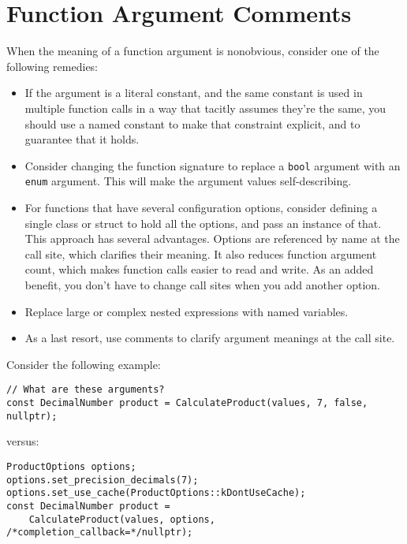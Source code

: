 
\section{Function Argument Comments}\label{sec:function-argument-comments}
When the meaning of a function argument is nonobvious, consider one of the following remedies:
\begin{itemize}
    \item If the argument is a literal constant, and the same constant is used in multiple function calls in a way that tacitly assumes they're the same, you should use a named constant to make that constraint explicit, and to guarantee that it holds.
    \item Consider changing the function signature to replace a \texttt{bool} argument with an \texttt{enum} argument. This will make the argument values self-describing.
    \item For functions that have several configuration options, consider defining a single class or struct to hold all the options, and pass an instance of that. This approach has several advantages. Options are referenced by name at the call site, which clarifies their meaning. It also reduces function argument count, which makes function calls easier to read and write. As an added benefit, you don't have to change call sites when you add another option.
    \item Replace large or complex nested expressions with named variables.
    \item As a last resort, use comments to clarify argument meanings at the call site.
\end{itemize}
Consider the following example:
\begin{verbatim}
// What are these arguments?
const DecimalNumber product = CalculateProduct(values, 7, false, nullptr);
\end{verbatim}
versus:
\begin{verbatim}
ProductOptions options;
options.set_precision_decimals(7);
options.set_use_cache(ProductOptions::kDontUseCache);
const DecimalNumber product =
    CalculateProduct(values, options, /*completion_callback=*/nullptr);
\end{verbatim}

